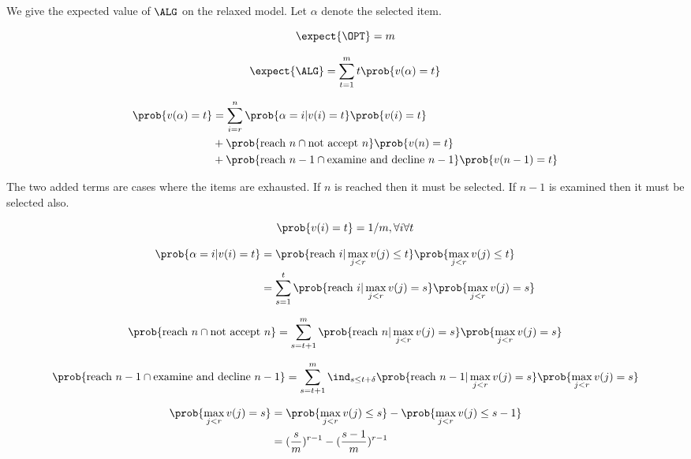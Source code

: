 We give the expected value of $\ALG$ on the relaxed model. Let $\alpha$ denote the selected item.

\begin{equation}
  \expect{\OPT}=m
\end{equation}

\begin{equation}
  \expect{\ALG}=\sum_{t=1}^m t\prob{v(\alpha)=t}
\end{equation}

\begin{align}
  \prob{v(\alpha)=t} &= \sum_{i=r}^n
  \prob{\alpha = i | v(i)=t}
  \prob{v(i)=t}\\&+
  \prob{\text{reach }n \cap \text{not accept }n} \prob{v(n)=t}\\&+
  \prob{\text{reach }n-1 \cap \text{examine and decline }n-1}\prob{v(n-1)=t}
\end{align}

The two added terms are cases where the items are exhausted. If $n$ is reached then it must be selected. If $n-1$ is examined then it must be selected also.

\begin{equation}
  \prob{v(i)=t}=1/m, \forall i\forall t
\end{equation}

\begin{align}
  \prob{\alpha = i | v(i)=t} &= \prob{\text{reach }i|\max_{j<r}v(j)\leq t}\prob{\max_{j<r}v(j)\leq t}\\&=
  \sum_{s=1}^t \prob{\text{reach }i|\max_{j<r}v(j)= s}\prob{\max_{j<r}v(j)= s}
\end{align}

\begin{equation}\label{eqn:exhaust1}
	\prob{\text{reach }n \cap \text{not accept }n}
	=\sum_{s=t+1}^m
		\prob{\text{reach }n|\max_{j<r}v(j)= s}\prob{\max_{j<r}v(j)= s}
\end{equation}

\begin{equation}\label{eqn:exhaust2}
	\prob{\text{reach }n-1 \cap \text{examine and decline }n-1}
	=\sum_{s=t+1}^m
		\ind_{s\leq t + \delta}
		\prob{\text{reach }n-1|\max_{j<r}v(j)= s}\prob{\max_{j<r}v(j)= s}
\end{equation}

\begin{align}
\prob{\max_{j<r}v(j)= s} 
	&= \prob{\max_{j<r}v(j)\leq s}-\prob{\max_{j<r}v(j)\leq s-1}\\
	&= (\frac{s}{m})^{r-1}-(\frac{s-1}{m})^{r-1}
\end{align}

